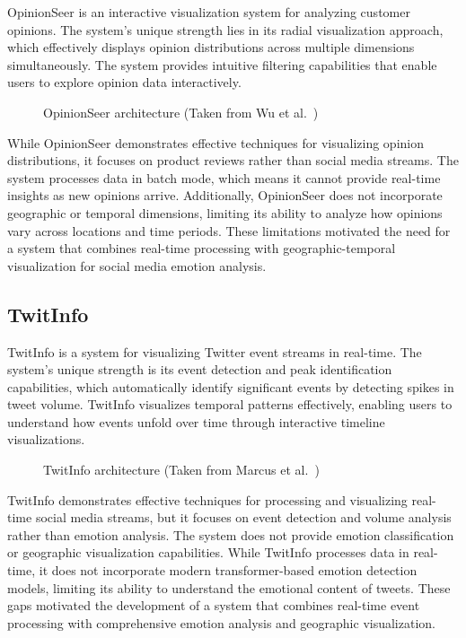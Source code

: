 OpinionSeer \cite{wu2009opinionseer} is an interactive visualization system for analyzing customer opinions. The system's unique strength lies in its radial visualization approach, which effectively displays opinion distributions across multiple dimensions simultaneously. The system provides intuitive filtering capabilities that enable users to explore opinion data interactively.

\begin{figure}[htbp]
\centering

\caption{OpinionSeer architecture (Taken from Wu et al.~\cite{wu2009opinionseer})}
\label{fig:opinionseer}
\end{figure}

While OpinionSeer demonstrates effective techniques for visualizing opinion distributions, it focuses on product reviews rather than social media streams. The system processes data in batch mode, which means it cannot provide real-time insights as new opinions arrive. Additionally, OpinionSeer does not incorporate geographic or temporal dimensions, limiting its ability to analyze how opinions vary across locations and time periods. These limitations motivated the need for a system that combines real-time processing with geographic-temporal visualization for social media emotion analysis.

\subsection{TwitInfo}

TwitInfo \cite{marcus2011twitinfo} is a system for visualizing Twitter event streams in real-time. The system's unique strength is its event detection and peak identification capabilities, which automatically identify significant events by detecting spikes in tweet volume. TwitInfo visualizes temporal patterns effectively, enabling users to understand how events unfold over time through interactive timeline visualizations.

\begin{figure}[htbp]
\centering

\caption{TwitInfo architecture (Taken from Marcus et al.~\cite{marcus2011twitinfo})}
\label{fig:twitinfo}
\end{figure}

TwitInfo demonstrates effective techniques for processing and visualizing real-time social media streams, but it focuses on event detection and volume analysis rather than emotion analysis. The system does not provide emotion classification or geographic visualization capabilities. While TwitInfo processes data in real-time, it does not incorporate modern transformer-based emotion detection models, limiting its ability to understand the emotional content of tweets. These gaps motivated the development of a system that combines real-time event processing with comprehensive emotion analysis and geographic visualization.

